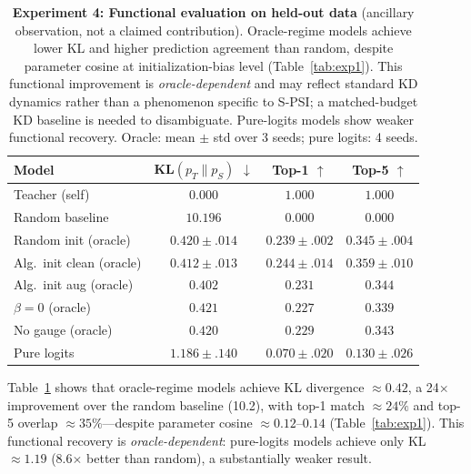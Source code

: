 \documentclass{article}
\begin{document}
\begin{table}[t]
\centering
\caption{\textbf{Experiment 4: Functional evaluation on held-out data} (ancillary observation, not a claimed contribution).  Oracle-regime models achieve lower KL and higher prediction agreement than random, despite parameter cosine at initialization-bias level (Table~\ref{tab:exp1}).  This functional improvement is \emph{oracle-dependent} and may reflect standard KD dynamics rather than a phenomenon specific to S-PSI; a matched-budget KD baseline is needed to disambiguate.  Pure-logits models show weaker functional recovery.  Oracle: mean $\pm$ std over 3 seeds; pure logits: 4 seeds.}
\label{tab:functional}
\small
\begin{tabular}{@{}l ccc@{}}
\toprule
\textbf{Model} & \textbf{KL$(p_T \| p_S)$} $\downarrow$ & \textbf{Top-1} $\uparrow$ & \textbf{Top-5} $\uparrow$ \\
\midrule
Teacher (self)         & $0.000$ & $1.000$ & $1.000$ \\
Random baseline        & $10.196$ & $0.000$ & $0.000$ \\
\midrule
Random init (oracle)   & $0.420 \pm .014$ & $0.239 \pm .002$ & $0.345 \pm .004$ \\
Alg.\ init clean (oracle) & $0.412 \pm .013$ & $0.244 \pm .014$ & $0.359 \pm .010$ \\
Alg.\ init aug (oracle) & $0.402$ & $0.231$ & $0.344$ \\
$\beta = 0$ (oracle)   & $0.421$ & $0.227$ & $0.339$ \\
No gauge (oracle)      & $0.420$ & $0.229$ & $0.343$ \\
\midrule
Pure logits            & $1.186 \pm .140$ & $0.070 \pm .020$ & $0.130 \pm .026$ \\
\bottomrule
\end{tabular}
\end{table}

Table~\ref{tab:functional} shows that oracle-regime models achieve KL divergence $\approx 0.42$, a 24$\times$ improvement over the random baseline (10.2), with top-1 match $\approx 24\%$ and top-5 overlap $\approx 35\%$---despite parameter cosine $\approx 0.12$--$0.14$ (Table~\ref{tab:exp1}).  This functional recovery is \emph{oracle-dependent}: pure-logits models achieve only KL $\approx 1.19$ (8.6$\times$ better than random), a substantially weaker result.
\end{document}
